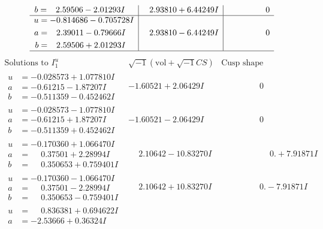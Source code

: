 \documentclass[1p]{elsarticle_modified}
\theoremstyle{definition}
\newcommand{\I}{\sqrt{-1}}
\begin{document}
$$\begin{array}{c|c|c}
\begin{aligned}
b &= \phantom{-}2.59506 - 2.01293 I\end{aligned}
 & \phantom{-}2.93810 + 6.44249 I & \phantom{-0.000000 } 0 \\ \hline\begin{aligned}
u &= -0.814686 - 0.705728 I \\
a &= \phantom{-}2.39011 - 0.79666 I \\
b &= \phantom{-}2.59506 + 2.01293 I\end{aligned}
 & \phantom{-}2.93810 - 6.44249 I & \phantom{-0.000000 } 0\\
 \hline 
 \end{array}$$\newpage$$\begin{array}{c|c|c}  
\text{Solutions to }I^u_{1}& \I (\text{vol} + \sqrt{-1}CS) & \text{Cusp shape}\\
 \hline 
\begin{aligned}
u &= -0.028573 + 1.077810 I \\
a &= -0.61215 - 1.87207 I \\
b &= -0.511359 - 0.452462 I\end{aligned}
 & -1.60521 + 2.06429 I & \phantom{-0.000000 } 0 \\ \hline\begin{aligned}
u &= -0.028573 - 1.077810 I \\
a &= -0.61215 + 1.87207 I \\
b &= -0.511359 + 0.452462 I\end{aligned}
 & -1.60521 - 2.06429 I & \phantom{-0.000000 } 0 \\ \hline\begin{aligned}
u &= -0.170360 + 1.066470 I \\
a &= \phantom{-}0.37501 + 2.28994 I \\
b &= \phantom{-}0.350653 + 0.759401 I\end{aligned}
 & \phantom{-}2.10642 - 10.83270 I & \phantom{-0.000000 -}0. + 7.91871 I \\ \hline\begin{aligned}
u &= -0.170360 - 1.066470 I \\
a &= \phantom{-}0.37501 - 2.28994 I \\
b &= \phantom{-}0.350653 - 0.759401 I\end{aligned}
 & \phantom{-}2.10642 + 10.83270 I & \phantom{-0.000000 } 0. - 7.91871 I \\ \hline\begin{aligned}
u &= \phantom{-}0.836381 + 0.694622 I \\
a &= -2.53666 + 0.36324 I \\

\end{aligned}
\end{array}$$
\end{document}
